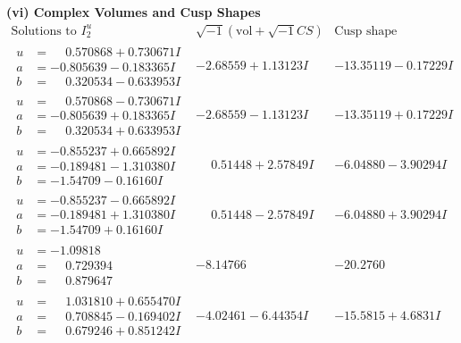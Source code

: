 \documentclass[1p]{elsarticle_modified}
\theoremstyle{definition}
\newcommand{\I}{\sqrt{-1}}
\begin{document}
\newpage\flushleft \textbf{(vi) Complex Volumes and Cusp Shapes}
$$\begin{array}{c|c|c}  
\text{Solutions to }I^u_{2}& \I (\text{vol} + \sqrt{-1}CS) & \text{Cusp shape}\\
 \hline 
\begin{aligned}
u &= \phantom{-}0.570868 + 0.730671 I \\
a &= -0.805639 - 0.183365 I \\
b &= \phantom{-}0.320534 - 0.633953 I\end{aligned}
 & -2.68559 + 1.13123 I & -13.35119 - 0.17229 I \\ \hline\begin{aligned}
u &= \phantom{-}0.570868 - 0.730671 I \\
a &= -0.805639 + 0.183365 I \\
b &= \phantom{-}0.320534 + 0.633953 I\end{aligned}
 & -2.68559 - 1.13123 I & -13.35119 + 0.17229 I \\ \hline\begin{aligned}
u &= -0.855237 + 0.665892 I \\
a &= -0.189481 - 1.310380 I \\
b &= -1.54709 - 0.16160 I\end{aligned}
 & \phantom{-}0.51448 + 2.57849 I & -6.04880 - 3.90294 I \\ \hline\begin{aligned}
u &= -0.855237 - 0.665892 I \\
a &= -0.189481 + 1.310380 I \\
b &= -1.54709 + 0.16160 I\end{aligned}
 & \phantom{-}0.51448 - 2.57849 I & -6.04880 + 3.90294 I \\ \hline\begin{aligned}
u &= -1.09818\phantom{ +0.000000I} \\
a &= \phantom{-}0.729394\phantom{ +0.000000I} \\
b &= \phantom{-}0.879647\phantom{ +0.000000I}\end{aligned}
 & -8.14766\phantom{ +0.000000I} & -20.2760\phantom{ +0.000000I} \\ \hline\begin{aligned}
u &= \phantom{-}1.031810 + 0.655470 I \\
a &= \phantom{-}0.708845 - 0.169402 I \\
b &= \phantom{-}0.679246 + 0.851242 I\end{aligned}
 & -4.02461 - 6.44354 I & -15.5815 + 4.6831 I \\ \hline\begin{aligned}

\end{aligned}
\end{array}$$
\end{document}
